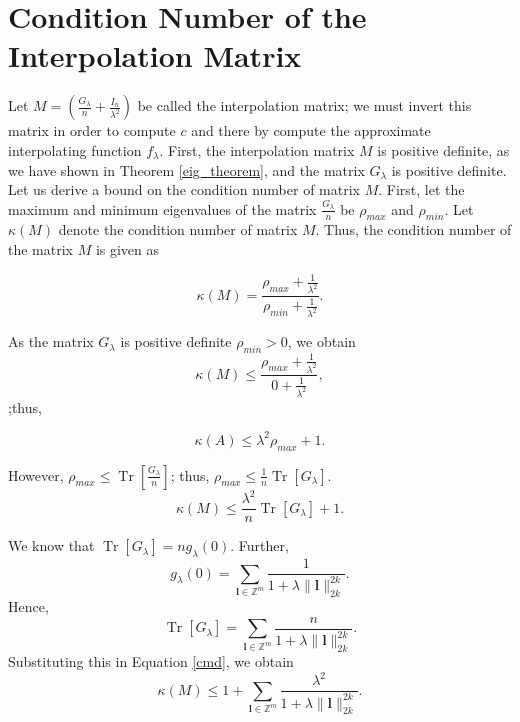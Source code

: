 \documentclass[multixcb]{amstext-l}
\theoremstyle{plain}
\theoremstyle{definition}
\theoremstyle{definition}
\theoremstyle{remark}
\numberwithin{equation}{chapter}
\DeclareMathOperator{\Tr}{Tr}
\begin{document}
\section{Condition Number of the Interpolation Matrix}
\label{condition_number_sec}
Let $M = (\frac{G_{\lambda}}{n}+\frac{I_n}{\lambda^2})$ be called the interpolation matrix; we must invert this matrix in order to compute $c$ and there by compute the approximate interpolating function $f_{\lambda}$. First, the interpolation matrix $M$ is positive definite, as we have shown in Theorem \ref{eig_theorem}, and the matrix $G_{\lambda}$ is positive definite. Let us derive a bound on the condition number of matrix $M$. First, let the maximum and minimum eigenvalues of the matrix $\frac{G_{\lambda}}{n}$ be $\rho_{max}$ and $\rho_{min}$. Let $\kappa(M)$ denote the condition number of matrix $M$. Thus, the condition number of the matrix $M$ is given as

\begin{equation}
    \kappa(M) = \frac{\rho_{max}+\frac{1}{\lambda^2}}{\rho_{min}+\frac{1}{\lambda^2}}.
\end{equation}

As the matrix $G_{\lambda}$ is positive definite $\rho_{min} > 0$, we obtain
\begin{equation}
    \kappa(M) \le \frac{\rho_{max}+\frac{1}{\lambda^2}}{0+\frac{1}{\lambda^2}},
\end{equation};thus, 

\begin{equation}
    \kappa(A) \le \lambda^2\rho_{max}+1.
\end{equation}

However, $\rho_{max} \le \Tr[\frac{G_{\lambda}}{n}]$; thus, $\rho_{max} \le \frac{1}{n}\Tr[G_{\lambda}]$.
\begin{equation}
\label{cmd}
    \kappa(M) \le \frac{\lambda^2}{n}\Tr[G_{\lambda}]+1.
\end{equation}

We know that $\Tr[G_{\lambda}] = ng_{\lambda}(0)$. Further, \begin{equation}
    g_{\lambda}(0) =  \sum_{\boldsymbol{l}\in\mathbb{Z}^m} \frac{1}{1+\lambda\|\boldsymbol{l}\|_{2k}^{2k}}. 
\end{equation} 
Hence, $$\Tr[G_{\lambda}] = \sum_{\boldsymbol{l}\in\mathbb{Z}^m} \frac{n}{1+\lambda\|\boldsymbol{l}\|_{2k}^{2k}}.$$
Substituting this in Equation \ref{cmd}, we obtain
\begin{equation}
\label{fcmd}
    \kappa(M) \le  1 + \sum_{\boldsymbol{l}\in\mathbb{Z}^m} \frac{\lambda^2}{1+\lambda\|\boldsymbol{l}\|_{2k}^{2k}}.
\end{equation}
\end{document}
